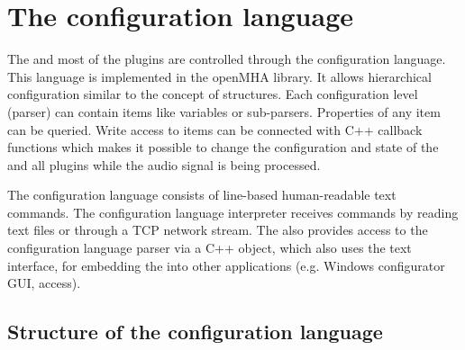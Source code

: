 

\section{The \mha{} configuration language}
\label{sec:script}

The \mhad{} and most of the \mha{} plugins are controlled
through the \mha{} configuration language. This language is implemented in the
openMHA library. It allows hierarchical configuration similar to the
concept of \Matlab{} structures. 
Each configuration level (parser)
can contain items like variables or sub-parsers. Properties of any item can be
queried.  Write access to items can be connected with C++ callback functions
which makes it possible to change the configuration and state of the \mha{} 
and all plugins while the audio signal is being processed.

The \mha{} configuration language consists of line-based human-readable
text commands.
The \mha{} configuration language interpreter receives commands by
reading text files or through a TCP network stream.  
The \mha{} also provides access to the configuration language parser via
a C++ object, 
which also uses the text interface,
for embedding the \mha{} into other applications (e.g. Windows \mha{}
configurator GUI, \Matlab{} access).

\subsection{Structure of the \mha{} configuration language}

